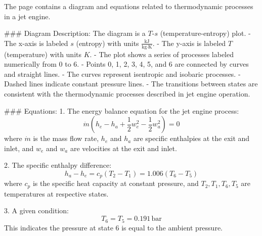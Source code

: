 The page contains a diagram and equations related to thermodynamic processes in a jet engine.

### Diagram Description:
The diagram is a \( T \)-\( s \) (temperature-entropy) plot.  
- The x-axis is labeled \( s \) (entropy) with units \( \frac{\text{kJ}}{\text{kg·K}} \).  
- The y-axis is labeled \( T \) (temperature) with units \( K \).  
- The plot shows a series of processes labeled numerically from 0 to 6.  
  - Points 0, 1, 2, 3, 4, 5, and 6 are connected by curves and straight lines.  
  - The curves represent isentropic and isobaric processes.  
  - Dashed lines indicate constant pressure lines.  
  - The transitions between states are consistent with the thermodynamic processes described in jet engine operation.  

### Equations:
1. The energy balance equation for the jet engine process:  
   \[
   \dot{m} \left( h_e - h_a + \frac{1}{2} w_e^2 - \frac{1}{2} w_a^2 \right) = 0
   \]  
   where \( \dot{m} \) is the mass flow rate, \( h_e \) and \( h_a \) are specific enthalpies at the exit and inlet, and \( w_e \) and \( w_a \) are velocities at the exit and inlet.

2. The specific enthalpy difference:  
   \[
   h_a - h_e = c_p (T_2 - T_1) = 1.006 (T_6 - T_5)
   \]  
   where \( c_p \) is the specific heat capacity at constant pressure, and \( T_2, T_1, T_6, T_5 \) are temperatures at respective states.

3. A given condition:  
   \[
   T_6 = T_5 = 0.191 \, \text{bar}
   \]  
   This indicates the pressure at state 6 is equal to the ambient pressure.